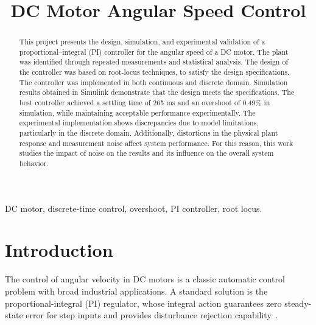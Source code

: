 \documentclass[conference]{IEEEtran}
\begin{document}
\renewcommand\IEEEkeywordsname{Keywords}

\title{DC Motor Angular Speed Control}

\author{
\vspace{2mm}
}

\maketitle

\begin{abstract}
This project presents the design, simulation, and experimental validation of a proportional–integral (PI) controller for the angular speed of a DC motor. The plant was identified through repeated measurements and statistical analysis. The design of the controller was based on root-locus techniques, to satisfy the design specifications. The controller was implemented in both continuous and discrete domain. Simulation results obtained in Simulink demonstrate that the design meets the specifications. The best controller achieved a settling time of 265 ms and an overshoot of 0.49\% in simulation, while maintaining acceptable performance experimentally. The experimental implementation shows discrepancies due to model limitations, particularly in the discrete domain. Additionally, distortions in the physical plant response and measurement noise affect system performance. For this reason, this work studies the impact of noise on the results and its influence on the overall system behavior.

\end{abstract}

\begin{IEEEkeywords}
DC motor, discrete-time control, overshoot, PI controller, root locus.
\end{IEEEkeywords}

\IEEEpeerreviewmaketitle

\section{Introduction}


The control of angular velocity in DC motors is a classic automatic control problem
with broad industrial applications. A standard solution is the proportional-integral
(PI) regulator, whose integral action guarantees zero steady-state error for step
inputs and provides disturbance rejection capability~\cite{ogata}.
\end{document}
